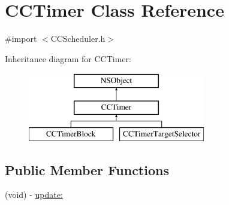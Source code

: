 \hypertarget{interface_c_c_timer}{\section{C\-C\-Timer Class Reference}
\label{interface_c_c_timer}
}


{\ttfamily \#import $<$C\-C\-Scheduler.\-h$>$}

Inheritance diagram for C\-C\-Timer\-:\begin{figure}[H]
\begin{center}
\leavevmode
\includegraphics[height=3.000000cm]{interface_c_c_timer}
\end{center}
\end{figure}
\subsection*{Public Member Functions}
\begin{DoxyCompactItemize}
\item 
(void) -\/ \hyperlink{interface_c_c_timer_a6cf9115615571fa8e1b4d83f4f79d1de}{update\-:}
\end{DoxyCompactItemize}
